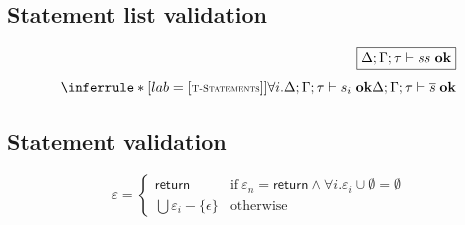 \documentclass{article}
\newcommand{\seq}[1]{\overline{{#1}}}
\newcommand{\rel}[1]{\scriptsize [\textsc{#1}]}
\newcommand{\ok}{\mathrm{\mathbf{ok}}}
\newcommand{\rulebreak}{\vspace{.1in}\\}
\newcommand{\mustret}{\mathsf{return}}
\newcommand{\sjudge}[4]{{#1};{#2};{#3} \vdash {#4}\ \ok}
\begin{document}
\subsection{Statement list validation}

\[
\begin{array}{c}
\multicolumn{1}{r}{\fbox{$\sjudge{\Delta}{\Gamma}{\tau}{\mathit{ss}}$}}
\rulebreak
\inferrule* [lab=\rel{T-Statements}]
  {\forall i . \sjudge{\Delta}{\Gamma}{\tau}{s_i}}
  {\sjudge{\Delta}{\Gamma}{\tau}{\seq{s}}}
\end{array}
\]


\subsection{Statement validation}

\newsavebox{\switchcontrol}
\begin{lrbox}{\switchcontrol}
\begin{minipage}[t]{2.87in}
\vspace{-.25in}
\[
\varepsilon = \left\{ \begin{array}{ll}
                      \mustret & \mbox{if}\ \varepsilon_n = \mustret \land \forall i . \varepsilon_i \cup \emptyset = \emptyset \\
                      \bigcup \varepsilon_i - \{ \epsilon \} & \mbox{otherwise}
                      \end{array} \right.
\]
\end{minipage}
\end{lrbox}
\end{document}
